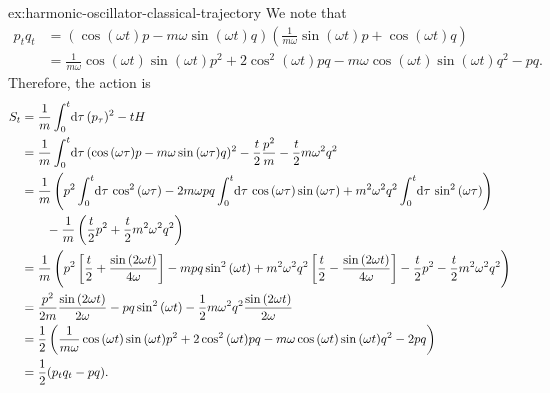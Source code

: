 \begin{DefAnswer}{ex:harmonic-oscillator-classical-trajectory}
	We note that
	\begin{subequations}
	\begin{align}
		p_t q_t
		&= \left( \cos{(\omega t)} p - m \omega \sin{(\omega t)} q \right)
			\left( \frac{1}{m \omega} \sin{(\omega t)} p + \cos{(\omega t)} q \right) \\
		&= \frac{1}{m \omega} \cos{(\omega t)} \sin{(\omega t)} p^2
			+ 2 \cos^2{(\omega t)} p q
			- m \omega \cos{(\omega t)} \sin{(\omega t)} q^2
			- p q.
	\end{align}
	\end{subequations}
	Therefore, the action is
	\begin{subequations}
	\begin{align}
		S_t
		&= \frac{1}{m} \int_0^t\! \dif \tau \, (p_\tau)^2 - t H \\
		&= \frac{1}{m} \int_0^t\! \dif \tau \, (\cos{(\omega \tau)} p - m \omega \sin{(\omega \tau)} q)^2
			- \frac{t}{2} \frac{p^2}{m} - \frac{t}{2} m \omega^2 q^2 \\
		&= \frac{1}{m} \left(
				p^2 \int_0^t\! \dif \tau \, \cos^2{(\omega \tau)}
				- 2 m \omega p q \int_0^t\! \dif \tau \, \cos{(\omega \tau)} \sin{(\omega \tau)}
				+ m^2 \omega^2 q^2 \int_0^t\! \dif \tau \,  \sin^2{(\omega \tau)}
			\right) \notag \\
		&\qquad
			- \frac{1}{m} \left( \frac{t}{2} p^2 + \frac{t}{2} m^2 \omega^2 q^2 \right) \\
		&= \frac{1}{m} \left(
				p^2 \left[ \frac{t}{2} + \frac{\sin{(2 \omega t)}}{4 \omega} \right]
				- m p q \sin^2{(\omega t)}
				+ m^2 \omega^2 q^2 \left[ \frac{t}{2} - \frac{\sin{(2 \omega t)}}{4 \omega} \right]
				- \frac{t}{2} p^2
				- \frac{t}{2} m^2 \omega^2 q^2
			\right) \\
		&= \frac{p^2}{2 m} \frac{\sin{(2 \omega t)}}{2 \omega}
			- p q \sin^2{(\omega t)}
			- \frac{1}{2} m \omega^2 q^2 \frac{\sin{(2 \omega t)}}{2 \omega} \\
		&= \frac{1}{2} \left(
				\frac{1}{m \omega} \cos{(\omega t)} \sin{(\omega t)} p^2
				+ 2 \cos^2{(\omega t)} p q
				- m \omega \cos{(\omega t)} \sin{(\omega t)} q^2
				- 2 p q
			\right) \\
		&= \frac{1}{2} (p_t q_t - p q).
	\end{align}
	\end{subequations}


\end{DefAnswer}

